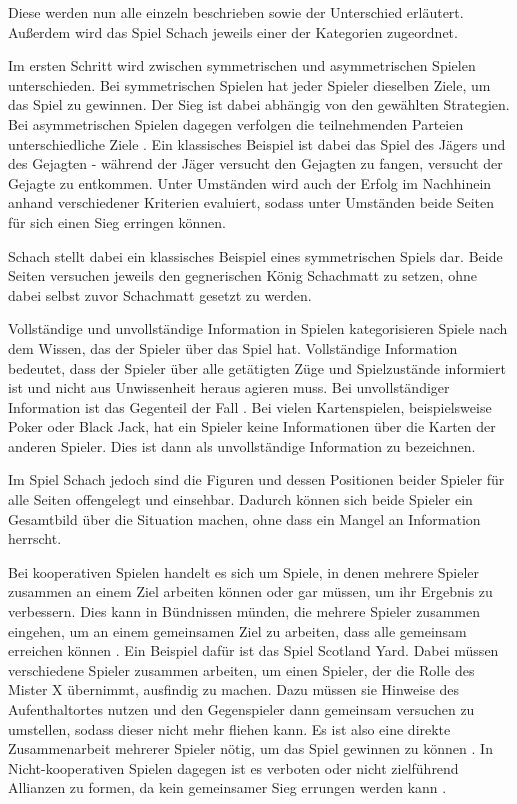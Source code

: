 Diese werden nun alle einzeln beschrieben sowie der Unterschied erläutert. Außerdem wird das Spiel Schach jeweils einer der Kategorien zugeordnet.

Im ersten Schritt wird zwischen symmetrischen und asymmetrischen Spielen unterschieden. Bei symmetrischen Spielen hat jeder Spieler dieselben Ziele, um das Spiel zu gewinnen. Der Sieg ist dabei abhängig von den gewählten Strategien. Bei asymmetrischen Spielen dagegen verfolgen die teilnehmenden Parteien unterschiedliche Ziele \cite{Rodriguez}. Ein klassisches Beispiel ist dabei das Spiel des Jägers und des Gejagten - während der Jäger versucht den Gejagten zu fangen, versucht der Gejagte zu entkommen. Unter Umständen wird auch der Erfolg im Nachhinein anhand verschiedener Kriterien evaluiert, sodass unter Umständen beide Seiten für sich einen Sieg erringen können.

Schach stellt dabei ein klassisches Beispiel eines symmetrischen Spiels dar. Beide Seiten versuchen jeweils den gegnerischen König Schachmatt zu setzen, ohne dabei selbst zuvor Schachmatt gesetzt zu werden.

Vollständige und unvollständige Information in Spielen kategorisieren Spiele nach dem Wissen, das der Spieler über das Spiel hat. Vollständige Information bedeutet, dass der Spieler über alle getätigten Züge und Spielzustände informiert ist und nicht aus Unwissenheit heraus agieren muss. Bei unvollständiger Information ist das Gegenteil der Fall \cite{Rodriguez}. Bei vielen Kartenspielen, beispielsweise Poker oder Black Jack, hat ein Spieler keine Informationen über die Karten der anderen Spieler. Dies ist dann als unvollständige Information zu bezeichnen.

Im Spiel Schach jedoch sind die Figuren und dessen Positionen beider Spieler für alle Seiten offengelegt und einsehbar. Dadurch können sich beide Spieler ein Gesamtbild über die Situation machen, ohne dass ein Mangel an Information herrscht.

Bei kooperativen Spielen handelt es sich um Spiele, in denen mehrere Spieler zusammen an einem Ziel arbeiten können oder gar müssen, um ihr Ergebnis zu verbessern. Dies kann in Bündnissen münden, die mehrere Spieler zusammen eingehen, um an einem gemeinsamen Ziel zu arbeiten, dass alle gemeinsam erreichen können \cite{Rodriguez}. Ein Beispiel dafür ist das Spiel Scotland Yard. Dabei müssen verschiedene Spieler zusammen arbeiten, um einen Spieler, der die Rolle des Mister X übernimmt, ausfindig zu machen. Dazu müssen sie Hinweise des Aufenthaltortes nutzen und den Gegenspieler dann gemeinsam versuchen zu umstellen, sodass dieser nicht mehr fliehen kann. Es ist also eine direkte Zusammenarbeit mehrerer Spieler nötig, um das Spiel gewinnen zu können  \cite{Ravensburg2000}. In Nicht-kooperativen Spielen dagegen ist es verboten oder nicht zielführend Allianzen zu formen, da kein gemeinsamer Sieg errungen werden kann \cite{Rodriguez}.

